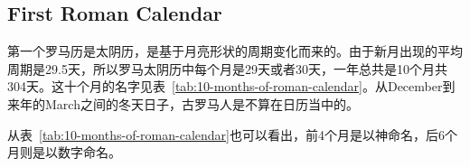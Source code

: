 
\subsection{First Roman Calendar}
\label{sec:first-roman-calendar}
第一个罗马历是太阴历，是基于月亮形状的周期变化而来的。由于新月出现的平均周期是29.5天，所以罗马太阴历中每个月是29天或者30天，一年总共是10个月共304天。这十个月的名字见表~\ref{tab:10-months-of-roman-calendar}。从December到来年的March之间的冬天日子，古罗马人是不算在日历当中的。

从表~\ref{tab:10-months-of-roman-calendar}也可以看出，前4个月是以神命名，后6个月则是以数字命名。


